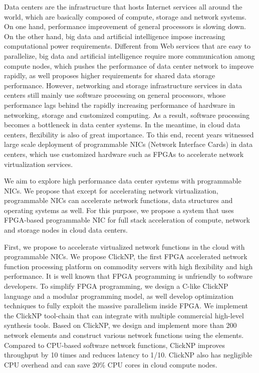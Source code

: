 \begin{enabstract}
	
Data centers are the infrastructure that hosts Internet services all around the world, which are basically composed of compute, storage and network systems.
On one hand, performance improvement of general processors is slowing down.
On the other hand, big data and artificial intelligence impose increasing computational power requirements.
Different from Web services that are easy to parallelize, big data and artificial intelligence require more communication among compute nodes, which pushes the performance of data center network to improve rapidly, as well proposes higher requirements for shared data storage performance.
However, networking and storage infrastructure services in data centers still mainly use software processing on general processors, whose performance lags behind the rapidly increasing performance of hardware in networking, storage and customized computing.
As a result, software processing becomes a bottleneck in data center systems.
In the meantime, in cloud data centers, flexibility is also of great importance.
To this end, recent years witnessed large scale deployment of programmable NICs (Network Interface Cards) in data centers, which use customized hardware such as FPGAs to accelerate network virtualization services.

We aim to explore high performance data center systems with programmable NICs.
We propose that except for accelerating network virtualization, programmable NICs can accelerate network functions, data structures and operating systems as well.
For this purpose, we propose a system that uses FPGA-based programmable NIC for full stack acceleration of compute, network and storage nodes in cloud data centers.

First, we propose to accelerate virtualized network functions in the cloud with programmable NICs. We propose ClickNP, the first FPGA accelerated network function processing platform on commodity servers with high flexibility and high performance.
It is well known that FPGA programming is unfriendly to software developers.
To simplify FPGA programming, we design a C-like ClickNP language and a modular programming model, as well develop optimization techniques to fully exploit the massive parallelism inside FPGA.
We implement the ClickNP tool-chain that can integrate with multiple commercial high-level synthesis tools.
Based on ClickNP, we design and implement more than 200 network elements and construct various network functions using the elements.
Compared to CPU-based software network functions, ClickNP improves throughput by 10 times and reduces latency to 1/10.
ClickNP also has negligible CPU overhead and can save 20\% CPU cores in cloud compute nodes.


\end{enabstract}
